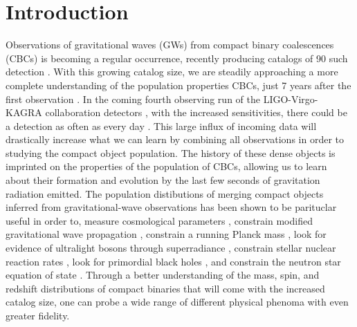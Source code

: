 \section{Introduction} \label{sec:intro}

Observations of gravitational waves (GWs) from compact binary coalescences (CBCs) is becoming a regular occurrence, 
recently producing catalogs of 90 such detection \cite{GWTC1,gwtc2,GWTC3}. With this growing catalog size, we are steadily approaching a more complete  
understanding of the population properties CBCs, just 7 years after the first observation \cite{o1o2_pop,o3a_pop,o3b_astro_dist}. 
In the coming fourth observing run of the LIGO-Virgo-KAGRA collaboration detectors \citep{aLIGO,aVIRGO}, with the increased sensitivities, 
there could be a detection as often as every day \cite{LVK_prospects}. This large influx of incoming data will drastically increase what we can learn by combining all observations
in order to studying the compact object population. The history of these dense objects is imprinted on the properties of the population 
of CBCs, allowing us to learn about their formation and evolution by the last few seconds of gravitation radiation emitted. The population distibutions 
of merging compact objects inferred from gravitational-wave observations has been shown to be parituclar useful in order to, measure cosmological parameters \citep{Farr_2019HUB,gwtc3_cosmo}, 
constrain modified gravitational wave propagation \citep{ModGWProp,ModGWProp2}, constrain a running Planck mass \citep{Lagos_runningPlanckMass}, look for evidence of ultralight bosons through superradiance \citep{Ng_Boson2021,GWTC2_superradiance_Ng}, 
constrain stellar nuclear reaction rates \citep{Farmer_2019,Farmer_2020}, look for primordial black holes \citep{Ng_2021,KenNgPBH2022}, and constrain the neutron star equation of state \citep{Golomb_EOS}. 
Through a better understanding of the mass, spin, and redshift distributions of compact binaries that will come with the increased catalog size, 
one can probe a wide range of different physical phenoma with even greater fidelity.

